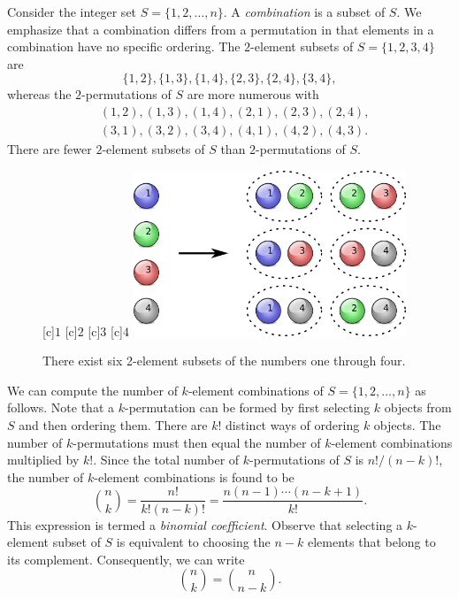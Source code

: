 Consider the integer set $S = \{ 1, 2, \ldots, n \}$.
A \emph{combination} is a subset of $S$. 
We emphasize that a combination differs from a permutation in that elements in a combination have no specific ordering.
The $2$-element subsets of $S = \{ 1, 2, 3, 4 \}$ are
\begin{equation*}
\{ 1, 2 \}, \{ 1, 3 \}, \{ 1, 4 \}, \{ 2, 3 \}, \{ 2, 4 \}, \{ 3, 4 \} ,
\end{equation*}
whereas the $2$-permutations of $S$ are more numerous with
\begin{equation*}
\begin{split}
&( 1, 2 ), ( 1, 3 ), ( 1, 4 ), ( 2, 1 ), ( 2, 3 ), ( 2, 4 ), \\
&( 3, 1 ), ( 3, 2 ), ( 3, 4 ), ( 4, 1 ), ( 4, 2 ), ( 4, 3 ) .
\end{split}
\end{equation*}
There are fewer $2$-element subsets of $S$ than $2$-permutations of $S$.

\begin{figure}[htb!]
\begin{center}
\begin{psfrags}
[c]{$1$}
[c]{$2$}
[c]{$3$}
[c]{$4$}
\includegraphics[height=4.95cm]{Figures/4Chapter/combination}
\end{psfrags}
\caption{There exist six 2-element subsets of the numbers one through four.}
\label{figure:Combination}
\end{center}
\end{figure}

We can compute the number of $k$-element combinations of $S = \{ 1, 2, \ldots, n \}$ as follows.
Note that a $k$-permutation can be formed by first selecting $k$ objects from $S$ and then ordering them.
There are $k!$ distinct ways of ordering $k$ objects.
The number of $k$-permutations must then equal the number of $k$-element combinations multiplied by $k!$.
Since the total number of $k$-permutations of $S$ is $n! / (n-k)!$, the number of $k$-element combinations is found to be
\begin{equation*}
\binom{n}{k} = \frac{n!}{k! (n-k)!} = \frac{ n (n-1) \cdots (n-k+1) }{ k! } .
\end{equation*}
This expression is termed a \emph{binomial coefficient}. 
Observe that selecting a $k$-element subset of $S$ is equivalent to choosing the $n-k$ elements that belong to its complement.
Consequently, we can write
\begin{equation*}
\binom{n}{k} = \binom{n}{n-k} .
\end{equation*}

